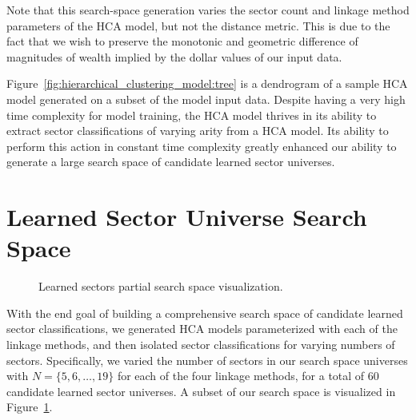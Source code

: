 \documentclass[../main.tex]{subfiles}
\begin{document}
Note that this search-space generation varies the sector count and linkage method parameters of the HCA model, but not the distance metric. This is due to the fact that we wish to preserve the monotonic and geometric difference of magnitudes of wealth implied by the dollar values of our input data.

Figure~\ref{fig:hierarchical_clustering_model:tree} is a dendrogram of a sample HCA model generated on a subset of the model input data. Despite having a very high time complexity for model training, the HCA model thrives in its ability to extract sector classifications of varying arity from a HCA model. Its ability to perform this action in constant time complexity greatly enhanced our ability to generate a large search space of candidate learned sector universes.


\pagebreak

\section{Learned Sector Universe Search Space}


\begin{figure}[h]
    \centering
    \caption{Learned sectors partial search space visualization.}
    \label{fig:hierarchical_clustering_model:partial_search_space}
\end{figure}

With the end goal of building a comprehensive search space of candidate learned sector classifications, we generated HCA models parameterized with each of the linkage methods, and then isolated sector classifications for varying numbers of sectors. Specifically, we varied the number of sectors in our search space universes with $N = \{5, 6, \ldots, 19 \}$ for each of the four linkage methods, for a total of 60 candidate learned sector universes. A subset of our search space is visualized in Figure~\ref{fig:hierarchical_clustering_model:partial_search_space}.
\end{document}
